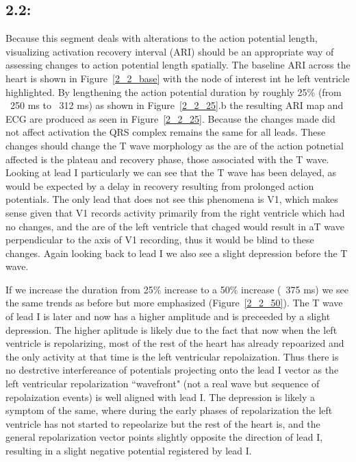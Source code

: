 \documentclass[12pt]{article}
\begin{document}
\subsection{2.2: }
Because this segment deals with alterations to the action potential length, visualizing activation recovery interval (ARI) should be an appropriate way of assessing changes to action potential length spatially. The baseline ARI across the heart is shown in Figure~\ref{2_2_base} with the node of interest int he left ventricle highlighted. By lengthening the action potential duration by roughly 25\% (from ~250 ms to ~312 ms) as shown in Figure~\ref{2_2_25}.b the resulting ARI map and ECG are produced as seen in Figure~\ref{2_2_25}. Because the changes made did not affect activation the QRS complex remains the same for all leads. These changes should change the T wave morphology as the are of the action potnetial affected is the plateau and recovery phase, those associated with the T wave. Looking at lead I particularly we can see that the T wave has been delayed, as would be expected by a delay in recovery resulting from prolonged action potentials. The only lead that does not see this phenomena is V1, which makes sense given that V1 records activity primarily from the right ventricle which had no changes, and the are of the left ventricle that chaged would result in aT wave perpendicular to the axis of V1 recording, thus it would be blind to these changes. Again looking back to lead I we also see a slight depression before the T wave. 

If we increase the duration from 25\% increase to a 50\% increase (~375 ms) we see the same trends as before but more emphasized (Figure~\ref{2_2_50}). The T wave of lead I is later and now has a higher amplitude and is preceeded by a slight depression. The higher aplitude is likely due to the fact that now when the left ventricle is repolarizing, most of the rest of the heart has already repoarized and the only activity at that time is the left ventricular repolaization. Thus there is no destrctive interfereance of potentials projecting onto the lead I vector as the left ventricular repolarization ``wavefront" (not a real wave but sequence of repolaization events) is well aligned with lead I. The depression is likely a symptom of the same, where during the early phases of repolarization the left ventricle has not started to repeolarize but the rest of the heart is, and the general repolarization vector points slightly opposite the direction of lead I, resulting in a slight negative potential registered by lead I.
\end{document}
